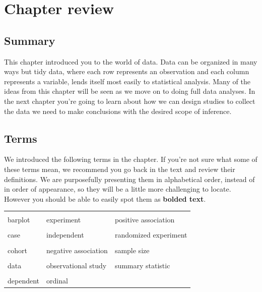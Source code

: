 \documentclass[
  10pt,
  openany]{book}
\theoremstyle{definition}
\theoremstyle{definition}
\theoremstyle{definition}
\theoremstyle{definition}
\theoremstyle{remark}
\begin{document}
\section{Chapter review}\label{chp1-review}

\subsection*{Summary}\label{summary}

This chapter introduced you to the world of data.
Data can be organized in many ways but tidy data, where each row represents an observation and each column represents a variable, lends itself most easily to statistical analysis.
Many of the ideas from this chapter will be seen as we move on to doing full data analyses.
In the next chapter you're going to learn about how we can design studies to collect the data we need to make conclusions with the desired scope of inference.

\subsection*{Terms}\label{terms}

We introduced the following terms in the chapter.
If you're not sure what some of these terms mean, we recommend you go back in the text and review their definitions.
We are purposefully presenting them in alphabetical order, instead of in order of appearance, so they will be a little more challenging to locate.
However you should be able to easily spot them as \textbf{bolded text}.

\begin{tabu} to 
\toprule
{} &  & \\
barplot & experiment & positive association\\
 &  & \\
case & independent & randomized experiment\\
 &  & \\
cohort & negative association & sample size\\
 &  & \\
data & observational study & summary statistic\\
 &  & \\
dependent & ordinal & \\
\bottomrule
\end{tabu}
\end{document}
